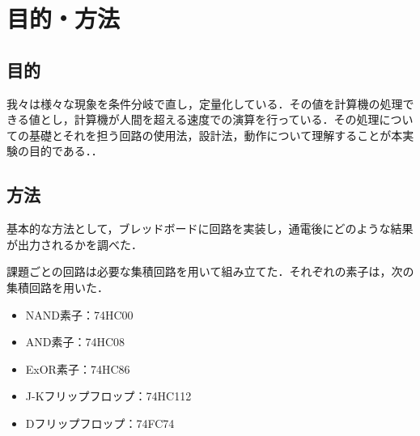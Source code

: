 %
%
%
\section{目的・方法}
\subsection{目的}
\label{perpose}
我々は様々な現象を条件分岐で直し，定量化している．その値を計算機の処理できる値とし，計算機が人間を超える速度での演算を行っている．その処理についての基礎とそれを担う回路の使用法，設計法，動作について理解することが本実験の目的である．．

%
%
%
\subsection{方法}
\label{method}
基本的な方法として，ブレッドボードに回路を実装し，通電後にどのような結果が出力されるかを調べた．

課題ごとの回路は必要な集積回路を用いて組み立てた．それぞれの素子は，次の集積回路を用いた．
\begin{itemize}
	\item NAND素子：74HC00
	\item AND素子：74HC08
	\item ExOR素子：74HC86
	\item J-Kフリップフロップ：74HC112
	\item Dフリップフロップ：74FC74
\end{itemize}

